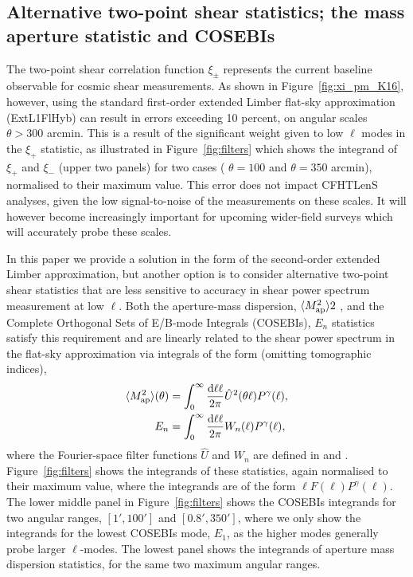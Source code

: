 \subsection{Alternative two-point shear statistics; the mass aperture statistic and COSEBIs}

The two-point shear correlation function $\xi_\pm$ represents the current baseline observable for cosmic shear measurements.   
As shown in Figure~\ref{fig:xi_pm_K16}, however, using the standard first-order extended Limber flat-sky approximation (ExtL1FlHyb) can result
in errors exceeding 10 percent, on angular scales $\theta > 300$ arcmin.    This is a result of the significant weight given to low $\ell$ modes in the $\xi_+$ statistic, as illustrated in Figure~\ref{fig:filters} which shows the integrand of $\xi_+$ and $\xi_-$ (upper two panels) for two cases ( $\theta = 100$ and $\theta = 350$ arcmin), normalised to their maximum
value.   This error does not impact CFHTLenS analyses, given the low signal-to-noise of the measurements on these scales.  It will however become increasingly important for upcoming wider-field surveys which will accurately probe these scales.

In this paper we provide a solution in the form of the second-order extended Limber approximation, but another option is to consider alternative two-point shear statistics that are less sensitive to accuracy in shear power spectrum measurement at low $\ell$.   Both the aperture-mass dispersion, $\langle M_ {\rm ap}^2 \rangle2$ \citep{1998MNRAS.296..873S}, and
the Complete Orthogonal Sets of E/B-mode Integrals (COSEBIs), $E_n$ \citep{COSEBIs} statistics satisfy this requirement and are linearly related to
the shear power spectrum in the flat-sky approximation via integrals of the form (omitting tomographic indices),
%
\begin{align}
  \langle M_ {\rm ap}^2 \rangle(\theta) & = \int_0^{\infty}\frac{{\rm d} \ell \ell}{2\pi}
  \hat U^2(\theta\ell) P^\gamma(\ell),
  \label{eqn:integ}
  \\
  E_n & = \int_0^{\infty}\frac{{\rm d} \ell \ell}{2\pi} W_n(\ell) P^\gamma(\ell),
\end{align}
%
where the Fourier-space filter functions $\hat U$ and $W_n$ are defined in
\cite{1998MNRAS.296..873S} and \cite{COSEBIs}. 
Figure~\ref{fig:filters} shows the integrands of these statistics, again normalised to their maximum
value, where the integrands are of the form $\ell F(\ell) P^\gamma(\ell)$.  
The lower middle panel in Figure~\ref{fig:filters} shows the
COSEBIs integrands for two angular ranges, $[1',100']$ and $[0.8',350']$, where
we only show the integrands for the lowest COSEBIs mode, $E_1$, as the higher
modes generally probe larger $\ell$-modes.  The lowest panel shows the
integrands of aperture mass dispersion statistics, for the same two maximum
angular ranges. 

